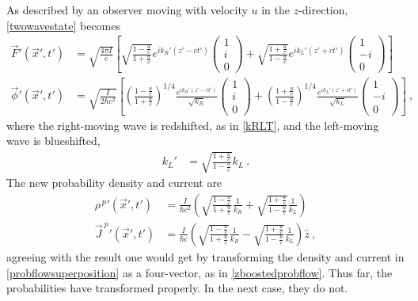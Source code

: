 \documentclass[12pt,secnumarabic,amsmath,amssymb,balancelastpage,nofootinbib]{article}
\begin{document}
As described by an observer moving with velocity $u$ in the $z$-direction, \eqref{twowavestate} becomes
\begin{align}
\vec{F}'(\vec{x}',t') &= \sqrt{\frac{4 \pi I}{c}}\left[
\sqrt{\frac{1-\frac{u}{c}}{1+\frac{u}{c}}}e^{i k_R' (z'-ct')}
\begin{pmatrix}
1 \\
i \\
0
\end{pmatrix}
+
\sqrt{\frac{1+\frac{u}{c}}{1-\frac{u}{c}}}e^{i k_L' (z'+ct')}
\begin{pmatrix}
1 \\
-i \\
0
\end{pmatrix}
\right]
\nonumber
\\
\vec{\phi}'(\vec{x}',t') &=\sqrt{\frac{I}{2 \hbar c^2}}\left[
 \left(\frac{1-\frac{u}{c}}{1+\frac{u}{c}}\right)^{1/4}\frac{e^{i k_R' (z'-ct')}}{\sqrt{k_R}}
\begin{pmatrix}
1 \\
i \\
0
\end{pmatrix}
+
 \left(\frac{1+\frac{u}{c}}{1-\frac{u}{c}}\right)^{1/4}\frac{e^{i k_L' (z'+ct')}}{\sqrt{k_L}}
\begin{pmatrix}
1 \\
-i \\
0
\end{pmatrix}
\right]
\ ,
\label{twowaveLT}
\end{align}
where the right-moving wave is redshifted, as in \eqref{kRLT}, and the left-moving wave is blueshifted,
\begin{align}
k_L'&=\sqrt{\frac{1+\frac{u}{c}}{1-\frac{u}{c}}}k_L
\ .
\end{align}
The new probability density and current are
\begin{align}
\rho^{\,p}{}'(\vec{x}',t') &=\frac{I}{\hbar c^2}\left(\sqrt{\frac{1-\frac{u}{c}}{1+\frac{u}{c}}}\frac{1}{k_R}+\sqrt{\frac{1+\frac{u}{c}}{1-\frac{u}{c}}}\frac{1}{k_L}\right)
\nonumber
\\
\vec{J}^{\:p}{}'(\vec{x}',t') &=\frac{I}{\hbar c}\left(\sqrt{\frac{1-\frac{u}{c}}{1+\frac{u}{c}}}\frac{1}{k_R}-\sqrt{\frac{1+\frac{u}{c}}{1-\frac{u}{c}}}\frac{1}{k_L}\right)\hat{z}
\ ,
\label{zboostedprobflowsuperposition}
\end{align}
agreeing with the result one would get by transforming the density and current in \eqref{probflowsuperposition} as a four-vector, as in \eqref{zboostedprobflow}.  Thus far, the probabilities have transformed properly.  In the next case, they do not.
\end{document}
